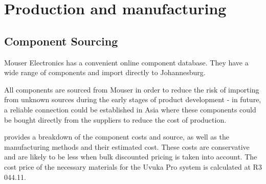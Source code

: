 \section{Production and manufacturing}
\subsection{Component Sourcing}
Mouser Electronics has a convenient online component database. They have a wide range of components and import directly to Johannesburg. 

All components are sourced from Mouser in order to reduce the risk of importing from unknown sources during the early stages of product development - in future, a reliable connection could be established in Asia where these components could be bought directly from the suppliers to reduce the cost of production. 

 provides a breakdown of the component costs and source, as well as the manufacturing methods and their estimated cost. These costs are conservative and are likely to be less when bulk discounted pricing is taken into account. The cost price of the necessary materials for the Uvuka Pro system is calculated at R3 044.11. 


